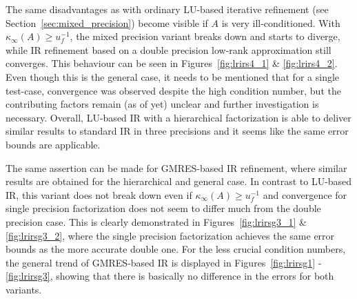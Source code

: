 The same disadvantages as with ordinary LU-based iterative refinement (see Section~\hyperref[sec:mixed_precision]{\ref{sec:mixed_precision}}) become visible if $A$ is very ill-conditioned. With $\kappa_\infty(A) \geq u_f^{-1}$, the mixed precision variant breaks down and starts to diverge, while IR refinement based on a double precision low-rank approximation still converges. This behaviour can be seen in Figures~\hyperref[fig:lrirs4_1]{\ref{fig:lrirs4_1}} \& \hyperref[fig:lrirs4_2]{\ref{fig:lrirs4_2}}. Even though this is the general case, it needs to be mentioned that for a single test-case, convergence was observed despite the high condition number, but the contributing factors remain (as of yet) unclear and further investigation is necessary. Overall, LU-based IR with a hierarchical factorization is able to deliver similar results to standard IR in three precisions and it seems like the same error bounds are applicable. 

The same assertion can be made for GMRES-based IR refinement, where similar results are obtained for the hierarchical and general case. In contrast to LU-based IR, this variant does not break down even if $\kappa_\infty(A) \geq u_f^{-1}$ and convergence for single precision factorization does not seem to differ much from the double precision case. This is clearly demonstrated in Figures~\hyperref[fig:lrirsg3_1]{\ref{fig:lrirsg3_1}} \& \hyperref[fig:lrirsg3_2]{\ref{fig:lrirsg3_2}}, where the single precision factorization achieves the same error bounds as the more accurate double one. For the less crucial condition numbers, the general trend of GMRES-based IR is displayed in Figures~\hyperref[fig:lrirsg1]{\ref{fig:lrirsg1}} - \hyperref[fig:lrirsg3]{\ref{fig:lrirsg3}}, showing that there is basically no difference in the errors for both variants.

